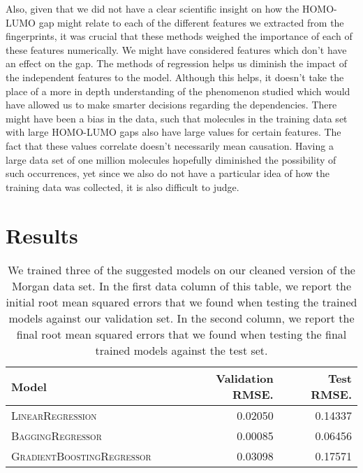 \documentclass[11pt]{article}
\begin{document}
Also, given that we did not have a clear scientific insight on how the HOMO-LUMO gap might relate to each of the different features we extracted from the fingerprints, it was crucial that these methods weighed the importance of each of these features numerically. We might have considered features which don't have an effect on the gap. The methods of regression helps us diminish the impact of the independent features to the model. Although this helps, it doesn't take the place of a more in depth understanding of the phenomenon studied which would have allowed us to make smarter decisions regarding the dependencies. 
There might have been a bias in the data, such that molecules in the training data set with large HOMO-LUMO gaps also have large values for certain features. The fact that these values correlate doesn't necessarily mean causation. Having a large data set of one million molecules hopefully diminished the possibility of such occurrences, yet since we also do not have a particular idea of how the training data was collected, it is also difficult to judge. 

\section{Results}

\begin{table}
\centering
\begin{tabular}{llrr}
 \toprule
 Model &  & Validation RMSE. & Test RMSE.\\
 \midrule
 \textsc{LinearRegression} & & 0.02050& 0.14337\\
 \textsc{BaggingRegressor} & & 0.00085& 0.06456\\
 \textsc{GradientBoostingRegressor} & & 0.03098 & 0.17571\\
 
 \bottomrule
\end{tabular}
\caption{\label{tab:results} We trained three of the suggested models on our cleaned version of the Morgan data set. In the first data column of this table, we report the initial root mean squared errors that we found when testing the trained models against our validation set. In the second column, we report the final root mean squared errors that we found when testing the final trained models against the test set.}
\end{table}
\end{document}

